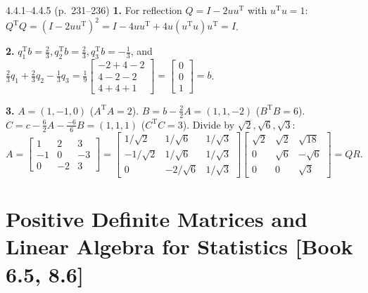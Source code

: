 \documentclass[11pt,a4paper,openany,oneside]{book}
\def\vect#1{#1}%
\def\mathbf#1{#1}%
\def\bk#1{ [Book #1]}%
\newcommand{\vect}[1]{\mathbf{#1}}
\newcommand{\T}{\mathrm{T}}
\numberwithin{equation}{chapter}
\newcommand{\bk}[1]{\texorpdfstring{\enspace{\normalfont\small\color{slate}[Book #1]}}{ [Book #1]}}
\begin{document}
\vfill
\begin{pageend_sol}{4.4.1--4.4.5 (p.\ 231--236)}
\textbf{1.} For reflection $Q = I - 2\vect{u}\vect{u}^\T$ with $\vect{u}^\T\vect{u}=1$: $Q^\T Q = (I-2\vect{u}\vect{u}^\T)^2 = I - 4\vect{u}\vect{u}^\T + 4\vect{u}(\vect{u}^\T\vect{u})\vect{u}^\T = I$.

\textbf{2.} $\vect{q}_1^\T\vect{b} = \frac{2}{3}, \vect{q}_2^\T\vect{b} = \frac{2}{3}, \vect{q}_3^\T\vect{b} = -\frac{1}{3}$, and $\frac{2}{3}\vect{q}_1 + \frac{2}{3}\vect{q}_2 - \frac{1}{3}\vect{q}_3 = \frac{1}{9}\begin{bmatrix}-2+4-2\\4-2-2\\4+4+1\end{bmatrix} = \begin{bmatrix}0\\0\\1\end{bmatrix} = \vect{b}$.

\textbf{3.} $\vect{A} = (1,-1,0)$ ($\vect{A}^\T\vect{A}=2$). $\vect{B} = \vect{b} - \frac{2}{2}\vect{A} = (1,1,-2)$ ($\vect{B}^\T\vect{B}=6$). $\vect{C} = \vect{c} - \frac{6}{2}\vect{A} - \frac{-6}{6}\vect{B} = (1,1,1)$ ($\vect{C}^\T\vect{C}=3$). Divide by $\sqrt{2}, \sqrt{6}, \sqrt{3}$:
\[
A = \begin{bmatrix}1&2&3\\-1&0&-3\\0&-2&3\end{bmatrix} = \begin{bmatrix}1/\sqrt{2} & 1/\sqrt{6} & 1/\sqrt{3}\\-1/\sqrt{2} & 1/\sqrt{6} & 1/\sqrt{3}\\0 & -2/\sqrt{6} & 1/\sqrt{3}\end{bmatrix} \begin{bmatrix}\sqrt{2} & \sqrt{2} & \sqrt{18}\\0 & \sqrt{6} & -\sqrt{6}\\0 & 0 & \sqrt{3}\end{bmatrix} = QR.
\]
\end{pageend_sol}
\clearpage

\chapter[Positive Definite Matrices and Statistics (6.5, 8.6)]{Positive Definite Matrices and Linear Algebra for Statistics\bk{6.5, 8.6}}
\end{document}
